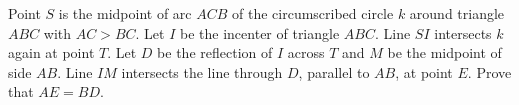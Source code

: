 Point $S$ is the midpoint of arc $ACB$ of the circumscribed circle $k$ around triangle $ABC$ with $AC>BC$. Let $I$ be the incenter of triangle $ABC$. Line $SI$ intersects $k$ again at point $T$. Let $D$ be the reflection of $I$ across $T$ and $M$ be the midpoint of side $AB$. Line $IM$ intersects the line through $D$, parallel to $AB$, at point $E$. Prove that $AE=BD$.